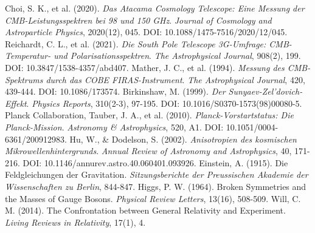\documentclass[12pt,a4paper]{article}
\begin{document}
\begin{thebibliography}{99}
		 Choi, S. K., et al. (2020). \textit{Das Atacama Cosmology Telescope: Eine Messung der CMB-Leistungsspektren bei 98 und 150 GHz}. \textit{Journal of Cosmology and Astroparticle Physics}, 2020(12), 045. DOI: 10.1088/1475-7516/2020/12/045.
		 Reichardt, C. L., et al. (2021). \textit{Die South Pole Telescope 3G-Umfrage: CMB-Temperatur- und Polarisationsspektren}. \textit{The Astrophysical Journal}, 908(2), 199. DOI: 10.3847/1538-4357/abd407.
		 Mather, J. C., et al. (1994). \textit{Messung des CMB-Spektrums durch das COBE FIRAS-Instrument}. \textit{The Astrophysical Journal}, 420, 439-444. DOI: 10.1086/173574.
		 Birkinshaw, M. (1999). \textit{Der Sunyaev-Zel'dovich-Effekt}. \textit{Physics Reports}, 310(2-3), 97-195. DOI: 10.1016/S0370-1573(98)00080-5.
		 Planck Collaboration, Tauber, J. A., et al. (2010). \textit{Planck-Vorstartstatus: Die Planck-Mission}. \textit{Astronomy \& Astrophysics}, 520, A1. DOI: 10.1051/0004-6361/200912983.
		 Hu, W., \& Dodelson, S. (2002). \textit{Anisotropien des kosmischen Mikrowellenhintergrunds}. \textit{Annual Review of Astronomy and Astrophysics}, 40, 171-216. DOI: 10.1146/annurev.astro.40.060401.093926.
		 Einstein, A. (1915). Die Feldgleichungen der Gravitation. \textit{Sitzungsberichte der Preussischen Akademie der Wissenschaften zu Berlin}, 844-847.
		 Higgs, P. W. (1964). Broken Symmetries and the Masses of Gauge Bosons. \textit{Physical Review Letters}, 13(16), 508-509.
		 Will, C. M. (2014). The Confrontation between General Relativity and Experiment. \textit{Living Reviews in Relativity}, 17(1), 4.
	\end{thebibliography}
	
\end{document}
